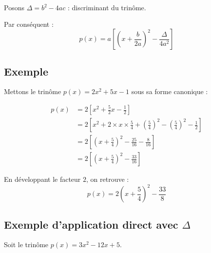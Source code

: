 \documentclass[12pt,a4paper]{article}
\begin{document}
Posons $\Delta = b^2 - 4ac$ : discriminant du trinôme.

Par conséquent :
\begin{equation*}
p(x) = a \left[ \left(x + \frac{b}{2a}\right)^2 - \frac{\Delta}{4a^2} \right]
\end{equation*}

\subsection*{Exemple}

Mettons le trinôme $p(x) = 2x^2 + 5x - 1$ sous sa forme canonique :

\begin{equation*}
\begin{aligned}
p(x) &= 2 \left[ x^2 + \frac{5}{2}x - \frac{1}{2} \right] \\
&= 2 \left[ x^2 + 2 \times x \times \frac{5}{4} + \left(\frac{5}{4}\right)^2 - \left(\frac{5}{4}\right)^2 - \frac{1}{2} \right] \\
&= 2 \left[ \left(x + \frac{5}{4}\right)^2 - \frac{25}{16} - \frac{8}{16} \right] \\
&= 2 \left[ \left(x + \frac{5}{4}\right)^2 - \frac{33}{16} \right]
\end{aligned}
\end{equation*}

En développant le facteur $2$, on retrouve :
\[
p(x) = 2\left(x + \frac{5}{4}\right)^2 - \frac{33}{8}
\]

\subsection*{Exemple d'application direct avec $\Delta$}

Soit le trinôme $p(x) = 3x^2 - 12x + 5$.
\end{document}
